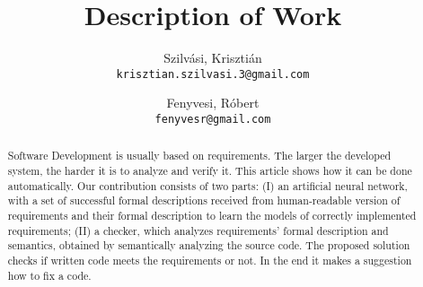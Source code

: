 \documentclass[11 pt,a4paper,english]{article}
\title{Description of Work}
\author{
	Szilvási, Krisztián\\
	\texttt{krisztian.szilvasi.3@gmail.com}
	\and
	Fenyvesi, Róbert\\
	\texttt{fenyvesr@gmail.com}
}
\begin{document}
\maketitle

\newpage

\begin{titlepage}
	\vspace*{9em}{\centering\Huge
		SEVENTH FRAMEWORK PROGRAMME\par}
	\vspace{1em}{\centering\LARGE
		INFORMATION AND COMMUNICATION TECHNOLOGIES (ICTs)\par}
	\vspace{1em}
	\vspace{1em}{\centering\Large
		[THEME TITLE]\par}
	
\end{titlepage}

\begin{abstract}
Software Development is usually based on requirements. The larger the developed system, the harder it is to analyze and verify it. This article shows how it can be done automatically. 
Our contribution consists of two parts: (I) an artificial neural network, with a set of successful formal descriptions received from human-readable version of requirements and their formal description to learn the models of correctly implemented requirements; (II) a checker, which analyzes requirements’ formal description and semantics, obtained by semantically analyzing the source code. 
The proposed solution checks if written code meets the requirements or not. In the end it makes a suggestion how to fix a code.
\end{abstract}

\section{}
\end{document}
